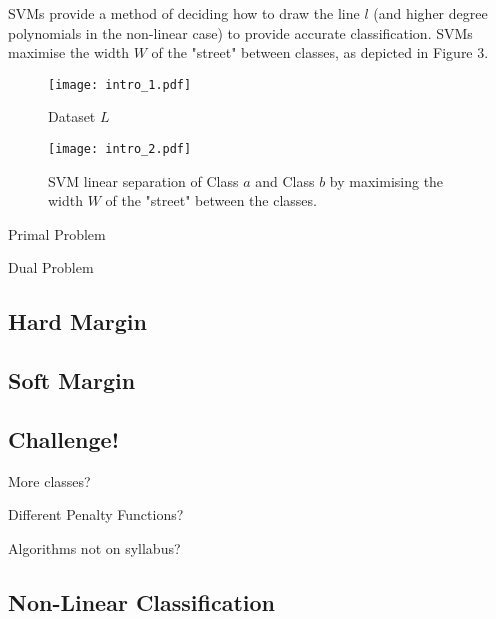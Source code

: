 \documentclass[10pt, a4paper]{amsart}
\begin{document}
SVMs provide a method of deciding how to draw the line $l$ (and higher degree polynomials in the non-linear case) to provide accurate classification. SVMs maximise the width $W$ of the "street" between classes, as depicted in Figure 3.

\begin{figure}
	\centering	
	\texttt{[image: intro\_1.pdf]}
	\caption{Dataset $L$}
\end{figure}

\begin{figure}
	\centering	
	\texttt{[image: intro\_2.pdf]}
	\caption{SVM linear separation of Class $a$ and Class $b$ by maximising the width $W$ of the "street" between the classes.}
\end{figure}





Primal Problem


%

Dual Problem

\subsection{Hard Margin}

\subsection{Soft Margin}

\subsection{Challenge!}\hfill

More classes?

Different Penalty Functions?

Algorithms not on syllabus?

\subsection{Non-Linear Classification}\hfill
\end{document}
